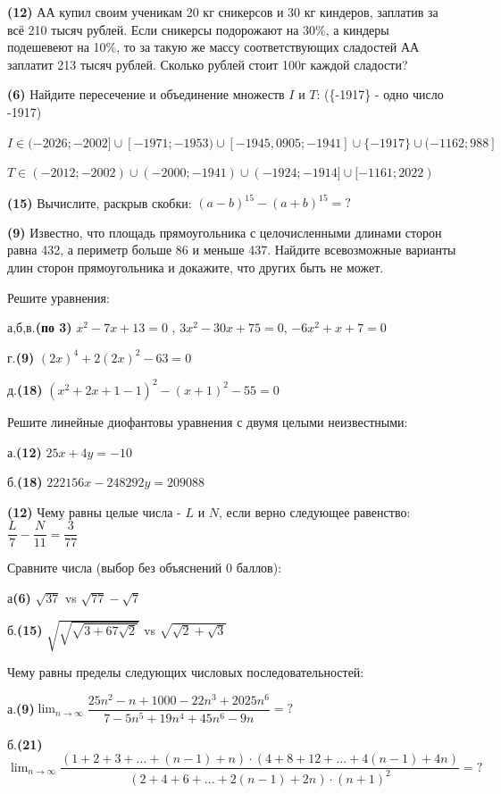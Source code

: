 \newpage

\textbf{(12)} АА купил своим ученикам 20 кг сникерсов и 30 кг киндеров, заплатив за всё 210 тысяч рублей. Если сникерсы подорожают на 30\%, а киндеры подешевеют на 10\%, то за такую же массу соответствующих сладостей АА заплатит 213 тысяч рублей. Сколько рублей стоит 100г каждой сладости?


\textbf{(6)} Найдите пересечение и объединение множеств $I$ и $T$: (\{-1917\} - одно число -1917)

$I \in (-2026;-2002] \cup [-1971;-1953) \cup [-1945,0905;-1941] \cup \{-1917\} \cup (-1162;988]$ 

$T \in (-2012;-2002) \cup (-2000;-1941) \cup (-1924;-1914] \cup [-1161;2022)$ 



\textbf{(15)} Вычислите, раскрыв скобки: $(a-b)^{15} - (a+b)^{15}=?$

\textbf{(9)} Известно, что площадь прямоугольника с целочисленными длинами сторон равна 432, а периметр больше 86 и меньше 437. Найдите всевозможные варианты длин сторон прямоугольника и докажите, что других быть не может.

 Решите уравнения:

а,б,в.\textbf{(по 3)} $x^2-7x+13=0$ , $3x^{2}-30x+75=0$, $-6x^{2}+x+7=0$

г.\textbf{(9)} $(2x)^{4}+2(2x)^{2}-63=0$

д.\textbf{(18)} $(x^2+2x+1-1)^2-(x+1)^2-55=0$

 Решите линейные диофантовы уравнения с двумя целыми неизвестными:

а.\textbf{(12)} $25x+4y=-10$

б.\textbf{(18)} $222156x-248292y=209088$


\textbf{(12)} Чему равны целые числа - $L$ и $N$, если верно следующее равенство: $\dfrac{L}{7}-\dfrac{N}{11}=\dfrac{3}{77}$



 Сравните числа (выбор без объяснений 0 баллов): 

а\textbf{(6)} $\sqrt{37}$ vs $\sqrt{77}-\sqrt{7}$

б.\textbf{(15)} $\sqrt{\sqrt{\sqrt{3+67\sqrt{2}}}}$ vs $\sqrt{\sqrt{2}+\sqrt{3}}$


 Чему равны пределы следующих числовых последовательностей:

а.\textbf{(9)}$\lim_{n\to \infty} \dfrac{25n^2-n+1000-22n^3+2025n^6}{7-5n^5+19n^4+45n^6-9n}=?$

б.\textbf{(21)}$\lim_{n\to \infty} \dfrac{(1+2+3+...+(n-1)+n)\cdot(4+8+12+...+4(n-1)+4n)}{(2+4+6+...+2(n-1)+2n)\cdot (n+1)^2}=?$
